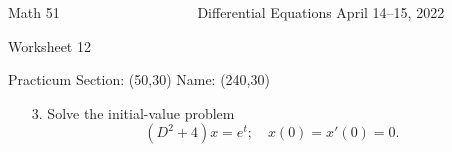 \documentclass[12pt]{article}
\begin{document}
\noindent
Math 51~~~~~~~~~~~~~~~~~~~ \hfill Differential Equations \hfill
April 14--15, 2022 
\centerline{Worksheet 12}

\bigskip

\noindent
Practicum Section: \framebox(50,30){} \hfill Name:  \framebox(240,30){}

\bigskip
\begin{enumerate}
\item[3.]  Solve the initial-value problem
  \[
    (D^2 + 4) x = e^t; \quad x(0) = x'(0) = 0.
  \]
  





\end{enumerate}
\end{document}
